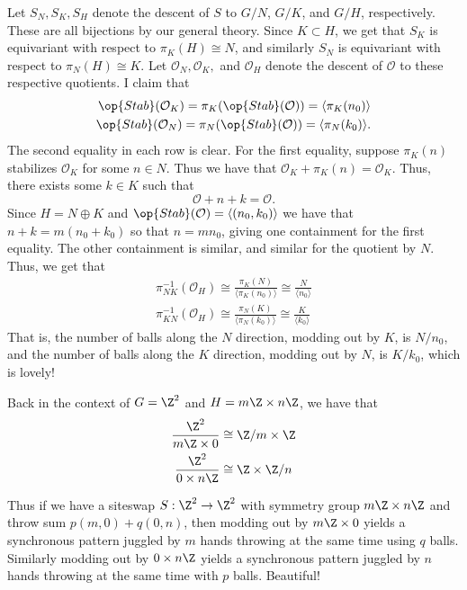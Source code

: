 \documentclass[12nt]{article}
\theoremstyle{plain}
\begin{document}
Let $S_N, S_K, S_H$ denote the descent of $S$ to $G/N$, $G/K$, and $G/H$, respectively. These are all bijections by our general theory. Since $K \subset H$, we get that $S_K$ is equivariant with respect to $\pi_K(H) \cong N$, and similarly $S_N$ is equivariant with respect to $\pi_N(H) \cong  K$. Let $\mathcal{O}_N, \mathcal{O}_K,$ and $\mathcal{O}_H$ denote the descent of $\mathcal{O}$ to these respective quotients. I claim that \begin{align*}
\op{Stab}(\mathcal{O}_K) = \pi_K(\op{Stab}(\mathcal{O})) = \langle \pi_K(n_0) \rangle \\
\op{Stab}(\mathcal{O}_N) = \pi_N(\op{Stab}(\mathcal{O})) = \langle \pi_N(k_0) \rangle.
\end{align*}
The second equality in each row is clear. For the first equality, suppose $\pi_K(n)$ stabilizes $\mathcal{O}_K$ for some $n \in N$. Thus we have that $\mathcal{O}_K + \pi_K(n) = \mathcal{O}_K$. Thus, there exists some $k \in K$ such that
\[
\mathcal{O} + n + k = \mathcal{O}.
\]
Since $H = N \oplus K$ and $\op{Stab}(\mathcal{O}) = \langle (n_0, k_0) \rangle$ we have that $n + k = m(n_0 + k_0)$ so that $n = mn_0$, giving one containment for the first equality. The other containment is similar, and similar for the quotient by $N$. Thus, we get that 
\begin{align*}
\pi_{NK}^{-1}(\mathcal{O}_H) \cong \frac{\pi_K(N)}{\langle \pi_K(n_0)\rangle } \cong \frac{N}{\langle n_0 \rangle} \\
\pi_{KN}^{-1}(\mathcal{O}_H) \cong \frac{\pi_N(K)}{\langle \pi_N(k_0)\rangle } \cong \frac{K}{\langle k_0\rangle }
\end{align*}
That is, the number of balls along the $N$ direction, modding out by $K$, is $N/n_0$, and the number of balls along the $K$ direction, modding out by $N$, is $K/k_0$, which is lovely!

Back in the context of $G = \Z^2$ and $H = m\Z \times n\Z$, we have that 
\begin{align*}
\frac{\Z^2}{m\Z \times 0} &\cong \Z/m \times \Z \\
\frac{\Z^2}{0 \times n\Z} &\cong \Z \times \Z/n
\end{align*}

Thus if we have a siteswap $S : \Z^2 \to \Z^2$ with symmetry group $m\Z \times n\Z$ and throw sum $p(m, 0) + q(0, n)$, then modding out by $m\Z \times 0$ yields a synchronous pattern juggled by $m$ hands throwing at the same time using $q$ balls. Similarly modding out by $0 \times n\Z$ yields a synchronous pattern juggled by $n$ hands throwing at the same time with $p$ balls. Beautiful!
\end{document}
